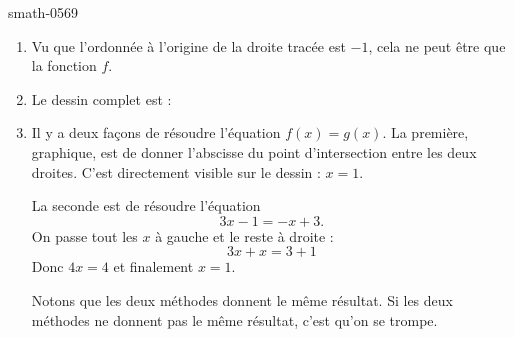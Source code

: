 
\begin{corrige}{smath-0569}

    \begin{enumerate}
        \item
            Vu que l'ordonnée à l'origine de la droite tracée est \( -1\), cela ne peut être que la fonction \( f\).
        \item
            Le dessin complet est :
            \begin{center}
                
            \end{center}
        \item
            Il y a deux façons de résoudre l'équation \( f(x)=g(x)\). La première, graphique, est de donner l'abscisse du point d'intersection entre les deux droites. C'est directement visible sur le dessin : \( x=1\). 

            La seconde est de résoudre l'équation
            \begin{equation}
                3x-1=-x+3.
            \end{equation}
            On passe tout les \( x\) à gauche et le reste à droite :
            \begin{equation}
                3x+x=3+1
            \end{equation}
            Donc \( 4x=4\) et finalement \( x=1\).

            Notons que les deux méthodes donnent le même résultat. Si les deux méthodes ne donnent pas le même résultat, c'est qu'on se trompe.

    \end{enumerate}

\end{corrige}
